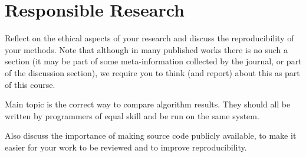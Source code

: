 \section{Responsible Research}
Reflect on the ethical aspects of your research and discuss the reproducibility of your methods.
Note that although in many published works there is no such a section (it may be part of some meta-information collected by the journal, or part of the discussion section), we require you to think (and report) about this as part of this course.

Main topic is the correct way to compare algorithm results. They should all be written by programmers of equal skill and be run on the same system.

Also discuss the importance of making source code publicly available, to make it easier for your work to be reviewed and to improve reproducibility. 
